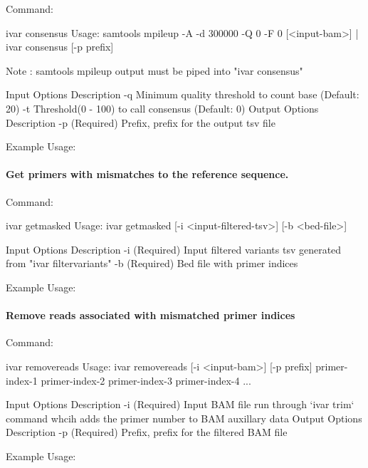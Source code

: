 Command\+: 
\begin{DoxyCode}
ivar consensus
Usage: samtools mpileup -A -d 300000 -Q 0 -F 0 [<input-bam>] | ivar consensus [-p prefix]

Note : samtools mpileup output must be piped into "ivar consensus"

Input Options    Description
           -q    Minimum quality threshold to count base (Default: 20)
           -t    Threshold(0 - 100) to call consensus (Default: 0)
Output Options   Description
           -p    (Required) Prefix, prefix for the output tsv file
\end{DoxyCode}


Example Usage\+: 
\begin{DoxyCode}
\end{DoxyCode}


\paragraph*{Get primers with mismatches to the reference sequence.}

Command\+: 
\begin{DoxyCode}
ivar getmasked
Usage: ivar getmasked [-i <input-filtered-tsv>] [-b <bed-file>]

Input Options    Description
           -i    (Required) Input filtered variants tsv generated from "ivar filtervariants"
           -b    (Required) Bed file with primer indices
\end{DoxyCode}


Example Usage\+: 
\begin{DoxyCode}
\end{DoxyCode}


\paragraph*{Remove reads associated with mismatched primer indices}

Command\+: 
\begin{DoxyCode}
ivar removereads
Usage: ivar removereads [-i <input-bam>] [-p prefix] primer-index-1 primer-index-2 primer-index-3
       primer-index-4 ...

Input Options    Description
           -i    (Required) Input BAM file run through `ivar trim` command whcih adds the primer number to
       BAM auxillary data
Output Options   Description
           -p    (Required) Prefix, prefix for the filtered BAM file
\end{DoxyCode}


Example Usage\+: 
\begin{DoxyCode}
\end{DoxyCode}
 